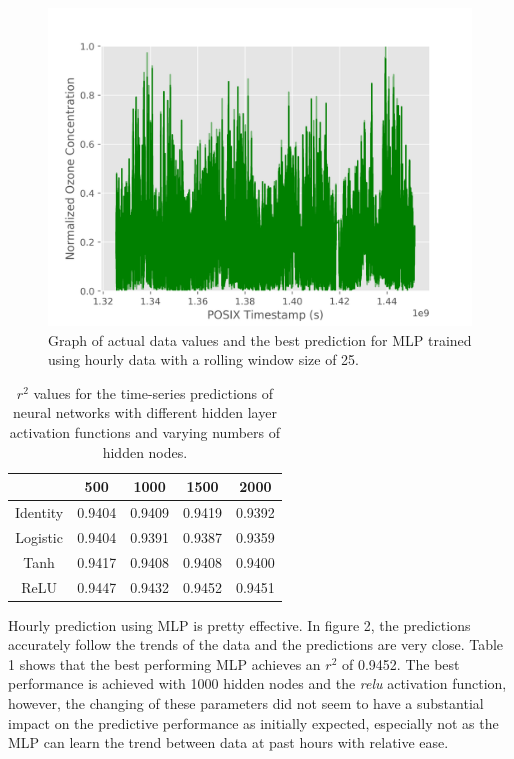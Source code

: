 \documentclass{article}
\begin{document}
\begin{figure}[H]
    \centering
    \includegraphics[scale=0.65]{H25_1500_RELU.png}
    \caption{Graph of actual data values and the best prediction for MLP trained using hourly data with a rolling window size of 25.}
\end{figure}

\begin{table}[H]
    \centering
    \begin{tabular}{| c | c | c | c | c |}
        \hline
        \cellcolor{black} & \cellcolor{Gray} 500 & \cellcolor{Gray} 1000 & \cellcolor{Gray} 1500 & \cellcolor{Gray} 2000 \\
        \hline
        \cellcolor{Gray} Identity & 0.9404 & 0.9409 & 0.9419 & 0.9392 \\
        \hline
        \cellcolor{Gray} Logistic & 0.9404 & 0.9391 & 0.9387 & 0.9359 \\
        \hline
        \cellcolor{Gray} Tanh & 0.9417 & 0.9408 & 0.9408 & 0.9400 \\
        \hline
        \cellcolor{Gray} ReLU & 0.9447 & 0.9432 & \cellcolor{green} 0.9452 & 0.9451 \\
        \hline
    \end{tabular}
    \caption{$r^2$ values for the time-series predictions of neural networks with different hidden layer activation functions and varying numbers of hidden nodes.}
\end{table}

Hourly prediction using MLP is pretty effective. In figure 2, the predictions accurately follow the trends of the data and the predictions are very close. Table 1 shows that the best performing MLP achieves an $r^2$ of 0.9452. The best performance is achieved with 1000 hidden nodes and the \textit{relu} activation function, however, the changing of these parameters did not seem to have a substantial impact on the predictive performance as initially expected, especially not as the MLP can learn the trend between data at past hours with relative ease.
\end{document}
